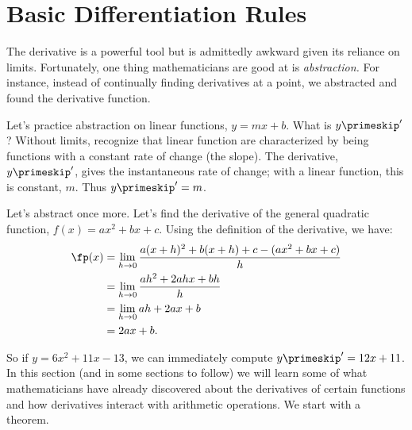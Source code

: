 \section{Basic Differentiation Rules}\label{sec:basic_diff_rules}

The derivative is a powerful tool but is admittedly awkward given its reliance on limits. Fortunately, one thing mathematicians are good at is \textit{abstraction.} For instance, instead of continually finding derivatives at a point, we abstracted and found the derivative function. 

Let's practice abstraction on linear functions, $y=mx+b$. What is $y\primeskip'$? Without limits, recognize that linear function are characterized by being functions with a constant rate of change (the slope). The derivative, $y\primeskip'$, gives the instantaneous rate of change; with a linear function, this is constant, $m$. Thus $y\primeskip'=m$. 

Let's abstract once more. Let's find the derivative of the general quadratic function, $f(x) = ax^2+bx+c$. Using the definition of the derivative, we have:
		\begin{align*}
		\fp(x) 	&=	\lim_{h\to 0}\frac{a(x+h)^2+b(x+h)+c-(ax^2+bx+c)}{h} \\
						&=	\lim_{h\to 0} \frac{ah^2+2ahx+bh}{h} \\
						&=	\lim_{h\to 0} ah+2ax+b\\
						&= 2ax+b.
		\end{align*}
		
So if $y = 6x^2+11x-13$, we can immediately compute $y\primeskip' = 12x+11$. \\

In this section (and in some sections to follow) we will learn some of what mathematicians have already discovered about the derivatives of certain functions and how derivatives interact with arithmetic operations. We start with a theorem.

